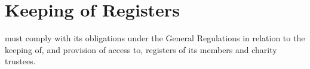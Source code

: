 \section{Keeping of Registers}\label{sec:registers}
\shortname{} must comply with its obligations under the General Regulations in relation to the keeping of, and provision of access to, registers of its members and charity trustees.
